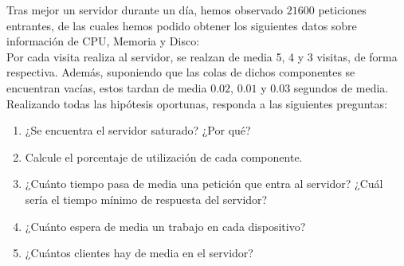 \documentclass[12pt]{article}
\begin{document}
    \begin{ejercicio}[2 puntos]
        Tras mejor un servidor durante un día, hemos observado $21600$ peticiones entrantes, de las cuales hemos podido obtener los siguientes datos sobre información de CPU, Memoria y Disco:\\

        \noindent
        Por cada visita realiza al servidor, se realzan de media 5, 4 y 3 visitas, de forma respectiva. Además, suponiendo que las colas de dichos componentes se encuentran vacías, estos tardan de media $0.02$, $0.01$ y $0.03$ segundos de media.\\

        \noindent
        Realizando todas las hipótesis oportunas, responda a las siguientes preguntas:

        \begin{enumerate}[label=\alph*)]
            \item ¿Se encuentra el servidor saturado? ¿Por qué?
            \item Calcule el porcentaje de utilización de cada componente.
            \item ¿Cuánto tiempo pasa de media una petición que entra al servidor? ¿Cuál sería el tiempo mínimo de respuesta del servidor?
            \item ¿Cuánto espera de media un trabajo en cada dispositivo?
            \item ¿Cuántos clientes hay de media en el servidor?
        \end{enumerate}
    \end{ejercicio}
\end{document}
